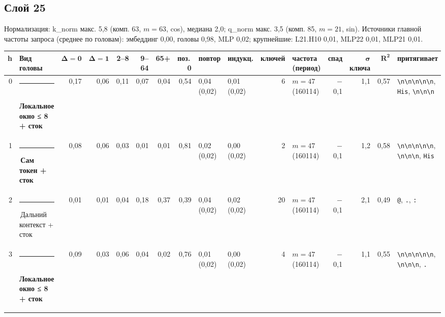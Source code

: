 \documentclass[10pt]{article}
\begin{document}
\noindent\begin{minipage}{\linewidth}
\subsection*{Слой 25}
{\small\color{ink2} Нормализация: k\_norm макс. 5,8 (комп. 63, $m{=}63$, cos), медиана 2,0; q\_norm макс. 3,5 (комп. 85, $m{=}21$, sin). Источники главной частоты запроса (среднее по головам): эмбеддинг 0,00, головы 0,98, MLP 0,02; крупнейшие: L21.H10 0,01, MLP22 0,01, MLP21 0,01.}
\begin{center}{\footnotesize\begin{tabular}{|r|l|r|r|r|r|r|r|l|l|r|l|r|r|r|l|}
\hline
\rowcolor{head}\textbf{h} & \textbf{Вид головы} & $\boldsymbol{\Delta{=}0}$ & $\boldsymbol{\Delta{=}1}$ & \textbf{2–8} & \textbf{9–64} & \textbf{65+} & \textbf{поз.\,0} & \textbf{повтор} & \textbf{индукц.} & \textbf{ключей} & \textbf{частота (период)} & \textbf{спад} & $\boldsymbol{\sigma}$ \textbf{ключа} & $\boldsymbol{R^2}$ & \textbf{притягивает} \\ \hline
0 & \textcolor[HTML]{1BAF7A}{\rule{0.62em}{0.62em}}\,\textbf{Локальное окно ≤ 8 + сток} & 0,17 & 0,06 & 0,11 & 0,07 & 0,04 & 0,54 & 0,04 (0,02) & 0,01 (0,02) & 6 & $m{=}47$ (160114) & $-$0,1 & 1,1 & 0,57 & \texttt{\textvisiblespace{}\textbackslash{}n\textbackslash{}n\textbackslash{}n\textbackslash{}n\textbackslash{}n}, \texttt{\textvisiblespace{}His}, \texttt{\textvisiblespace{}\textbackslash{}n\textbackslash{}n\textbackslash{}n} \\ \hline
1 & \textcolor[HTML]{2A78D6}{\rule{0.62em}{0.62em}}\,\textbf{Сам токен + сток} & 0,08 & 0,06 & 0,03 & 0,01 & 0,01 & 0,81 & 0,02 (0,02) & 0,00 (0,02) & 2 & $m{=}47$ (160114) & $-$0,1 & 1,2 & 0,58 & \texttt{\textvisiblespace{}\textbackslash{}n\textbackslash{}n\textbackslash{}n\textbackslash{}n\textbackslash{}n}, \texttt{\textvisiblespace{}\textbackslash{}n\textbackslash{}n\textbackslash{}n}, \texttt{\textvisiblespace{}His} \\ \hline
2 & \textcolor[HTML]{C3C2B7}{\rule{0.62em}{0.62em}}\,Дальний контекст + сток & 0,01 & 0,01 & 0,04 & 0,18 & 0,37 & 0,39 & 0,04 (0,02) & 0,02 (0,02) & 20 & $m{=}47$ (160114) & $-$0,1 & 2,1 & 0,49 & \texttt{\textvisiblespace{}@}, \texttt{\textvisiblespace{}.}, \texttt{\textvisiblespace{}:} \\ \hline
3 & \textcolor[HTML]{1BAF7A}{\rule{0.62em}{0.62em}}\,\textbf{Локальное окно ≤ 8 + сток} & 0,09 & 0,03 & 0,06 & 0,04 & 0,02 & 0,76 & 0,01 (0,02) & 0,00 (0,02) & 4 & $m{=}47$ (160114) & $-$0,1 & 1,1 & 0,55 & \texttt{\textvisiblespace{}\textbackslash{}n\textbackslash{}n\textbackslash{}n\textbackslash{}n\textbackslash{}n}, \texttt{\textvisiblespace{}\textbackslash{}n\textbackslash{}n\textbackslash{}n}, \texttt{\textvisiblespace{}.} \\ \hline

\end{tabular}}
\end{center}
\end{minipage}
\end{document}
